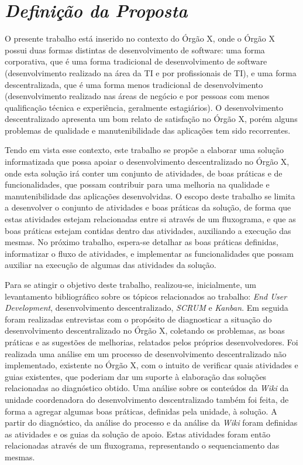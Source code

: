 \section{\textit{Definição da Proposta}}

O presente trabalho está inserido no contexto do Órgão X, onde o Órgão X possui duas formas distintas de desenvolvimento de software: uma forma corporativa, que é uma forma tradicional de desenvolvimento de software (desenvolvimento realizado na área da TI e por profissionais de TI), e uma forma descentralizada, que é uma forma menos tradicional de desenvolvimento (desenvolvimento realizado nas áreas de negócio e por pessoas com menos qualificação técnica e experiência, geralmente estagiários).
O desenvolvimento descentralizado apresenta um bom relato de satisfação no Órgão X, porém alguns problemas de qualidade e manutenibilidade das aplicações tem sido recorrentes.

Tendo em vista esse contexto, este trabalho se propõe a elaborar uma solução informatizada que possa apoiar o desenvolvimento descentralizado no Órgão X, onde esta solução irá conter um conjunto de atividades, de boas práticas e de funcionalidades, que possam contribuir para uma melhoria na qualidade e manutenibilidade das aplicações desenvolvidas. O escopo deste trabalho se limita a desenvolver o conjunto de atividades e boas práticas da solução, de forma que estas atividades estejam relacionadas entre si através de um fluxograma, e que as boas práticas estejam contidas dentro das atividades, auxiliando a execução das mesmas. No próximo trabalho, espera-se detalhar as boas práticas definidas, informatizar o fluxo de atividades, e implementar as funcionalidades que possam auxiliar na execução de algumas das atividades da solução.

Para se atingir o objetivo deste trabalho, realizou-se, inicialmente, um levantamento bibliográfico sobre os tópicos relacionados ao trabalho: \textit{End User Development}, desenvolvimento descentralizado, \textit{SCRUM} e \textit{Kanban}. Em seguida foram realizadas entrevistas com o propósito de diagnosticar a situação do desenvolvimento descentralizado no Órgão X, coletando os problemas, as boas práticas e as sugestões de melhorias, relatados pelos próprios desenvolvedores. Foi realizada uma análise em um processo de desenvolvimento descentralizado não implementado, existente no Órgão X, com o intuito de verificar quais atividades e guias existentes, que poderiam dar um suporte à elaboração das soluções relacionadas ao diagnóstico obtido. Uma análise sobre os conteúdos da \textit{Wiki} da unidade coordenadora do desenvolvimento descentralizado também foi feita, de forma a agregar algumas boas práticas, definidas pela unidade, à solução. A partir do diagnóstico, da análise do processo e da análise da \textit{Wiki} foram definidas as atividades e os guias da solução de apoio. Estas atividades foram então relacionadas através de um fluxograma, representando o sequenciamento das mesmas.

